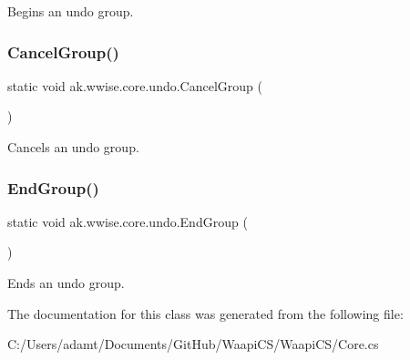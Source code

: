 Begins an undo group. 

\mbox{\label{classak_1_1wwise_1_1core_1_1undo_afe129a0834826920097efa39c0d5fb2e}} 
\subsubsection{\texorpdfstring{Cancel\+Group()}{CancelGroup()}}
{\footnotesize\ttfamily static void ak.\+wwise.\+core.\+undo.\+Cancel\+Group (\begin{DoxyParamCaption}{ }\end{DoxyParamCaption})\hspace{0.3cm}{\ttfamily [static]}}



Cancels an undo group. 

\mbox{\label{classak_1_1wwise_1_1core_1_1undo_ae7cdf90c5b5668d13b74e5b37d81cea6}} 
\subsubsection{\texorpdfstring{End\+Group()}{EndGroup()}}
{\footnotesize\ttfamily static void ak.\+wwise.\+core.\+undo.\+End\+Group (\begin{DoxyParamCaption}{ }\end{DoxyParamCaption})\hspace{0.3cm}{\ttfamily [static]}}



Ends an undo group. 



The documentation for this class was generated from the following file\+:\begin{DoxyCompactItemize}
\item 
C\+:/\+Users/adamt/\+Documents/\+Git\+Hub/\+Waapi\+C\+S/\+Waapi\+C\+S/Core.\+cs\end{DoxyCompactItemize}
